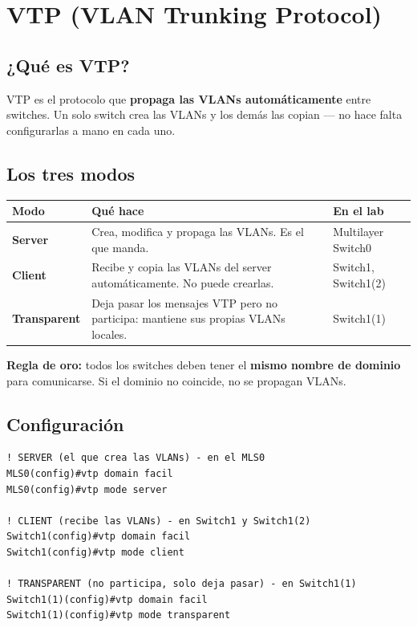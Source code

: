 \documentclass[11pt,a4paper]{report}
\begin{document}
\chapter{VTP (VLAN Trunking Protocol)}

\section{¿Qué es VTP?}

VTP es el protocolo que \textbf{propaga las VLANs automáticamente} entre switches. Un solo switch crea las VLANs y los demás las copian — no hace falta configurarlas a mano en cada uno.

\section{Los tres modos}

\begin{longtable}{@{}p{3.5cm}p{6cm}p{6cm}@{}}
\toprule
\textbf{Modo} & \textbf{Qué hace} & \textbf{En el lab} \\
\midrule
\endhead
\textbf{Server} & Crea, modifica y propaga las VLANs. Es el que manda. & Multilayer Switch0 \\
\addlinespace
\textbf{Client} & Recibe y copia las VLANs del server automáticamente. No puede crearlas. & Switch1, Switch1(2) \\
\addlinespace
\textbf{Transparent} & Deja pasar los mensajes VTP pero no participa: mantiene sus propias VLANs locales. & Switch1(1) \\
\bottomrule
\end{longtable}

\textbf{Regla de oro:} todos los switches deben tener el \textbf{mismo nombre de dominio} para comunicarse. Si el dominio no coincide, no se propagan VLANs.

\section{Configuración}

\begin{lstlisting}
! SERVER (el que crea las VLANs) - en el MLS0
MLS0(config)#vtp domain facil
MLS0(config)#vtp mode server

! CLIENT (recibe las VLANs) - en Switch1 y Switch1(2)
Switch1(config)#vtp domain facil
Switch1(config)#vtp mode client

! TRANSPARENT (no participa, solo deja pasar) - en Switch1(1)
Switch1(1)(config)#vtp domain facil
Switch1(1)(config)#vtp mode transparent
\end{lstlisting}
\end{document}
